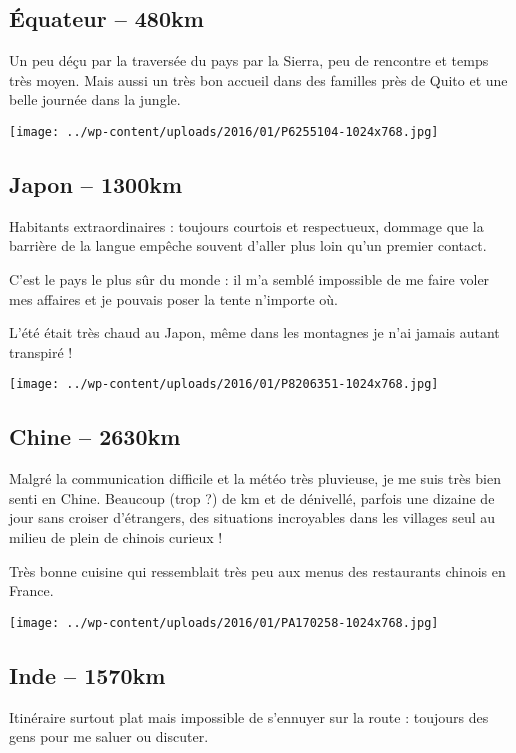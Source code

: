  \pagebreak
 \subsection*{\'Equateur – 480km}
 Un peu déçu par la traversée du pays par la Sierra, peu de rencontre et temps très moyen. Mais aussi un très bon accueil dans des familles près de Quito et une belle journée dans la jungle. 
\begin{center} \texttt{[image: ../wp-content/uploads/2016/01/P6255104-1024x768.jpg]} \end{center}

\pagebreak
 \subsection*{Japon – 1300km}
 Habitants extraordinaires : toujours courtois et respectueux, dommage que la barrière de la langue empêche souvent d'aller plus loin qu'un premier contact. 

 C'est le pays le plus sûr du monde : il m'a semblé impossible de me faire voler mes affaires et je pouvais poser la tente n'importe où. 

 L'été était très chaud au Japon, même dans les montagnes je n'ai jamais autant transpiré ! 
\begin{center} \texttt{[image: ../wp-content/uploads/2016/01/P8206351-1024x768.jpg]} \end{center}

\pagebreak
 \subsection*{Chine – 2630km}
 Malgré la communication difficile et la météo très pluvieuse, je me suis très bien senti en Chine. Beaucoup (trop ?) de km et de dénivellé, parfois une dizaine de jour sans croiser d'étrangers, des situations incroyables dans les villages seul au milieu de plein de chinois curieux ! 

 Très bonne cuisine qui ressemblait très peu aux menus des restaurants chinois en France.
\begin{center} \texttt{[image: ../wp-content/uploads/2016/01/PA170258-1024x768.jpg]} \end{center}

\pagebreak
 \subsection*{Inde – 1570km}
 Itinéraire surtout plat mais impossible de s'ennuyer sur la route : toujours des gens pour me saluer ou discuter.

